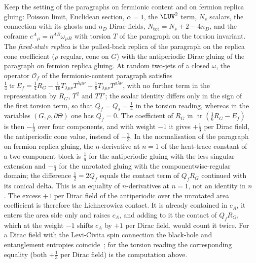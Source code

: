 Keep the setting of the paragraphs on fermionic content and on fermion replica gluing: Poisson limit, Euclidean section, \(\alpha=1\), the \(\LUV^2\) term, \(N_s\) scalars, the connection with its ghosts and \(n_D\) Dirac fields, \(N_{\mathrm{tot}}=N_s+2-4n_D\), and the coframe \(e^A{}_\mu=\eta^{AB}\omega_{\mu B}\) with torsion \(T\) of the paragraph on the torsion invariant. The \emph{fixed-state replica} is the pulled-back replica of the paragraph on the replica cone coefficient (\(\rho\) regular, cone on \(G\)) with the antiperiodic Dirac gluing of the paragraph on fermion replica gluing. At random two-jets of a closed \(\omega\), the operator \(\mathcal O_f\) of the fermionic-content paragraph satisfies \(\tfrac14\operatorname{tr}E_f=\tfrac14R_G-\tfrac1{16}T_{\lambda\mu\nu}T^{\lambda\mu\nu}+\tfrac18T_{\lambda\mu\nu}T^{\mu\lambda\nu}\), with no further term in the representation by \(R_G\), \(T^2\) and \(TT'\); the scalar identity differs only in the sign of the first torsion term, so that \(Q_f=Q_s=\tfrac14\) in the torsion reading, whereas in the variables \((G,\rho,\partial\Theta)\) one has \(Q_f=0\). The coefficient of \(R_G\) in \(\operatorname{tr}(\tfrac16R_G-E_f)\) is then \(-\tfrac13\) over four components, and with weight \(-1\) it gives \(+\tfrac13\) per Dirac field, the antiperiodic cone value, instead of \(-\tfrac23\). In the normalisation of the paragraph on fermion replica gluing, the \(n\)-derivative at \(n=1\) of the heat-trace constant of a two-component block is \(\tfrac16\) for the antiperiodic gluing with the less singular extension and \(-\tfrac13\) for the unrotated gluing with the componentwise-regular domain; the difference \(\tfrac12=2Q_f\) equals the contact term of \(Q_fR_G\) continued with its conical delta. This is an equality of \(n\)-derivatives at \(n=1\), not an identity in \(n\). The excess \(+1\) per Dirac field of the antiperiodic over the unrotated area coefficient is therefore the Lichnerowicz contact. It is already contained in \(c_A\), it enters the area side only and raises \(c_A\), and adding to it the contact of \(Q_fR_G\), which at the weight \(-1\) shifts \(c_A\) by \(+1\) per Dirac field, would count it twice. For a Dirac field with the Levi-Civita spin connection the black-hole and entanglement entropies coincide~\cite{Kabat1995}; for the torsion reading the corresponding equality (both \(+\tfrac13\) per Dirac field) is the computation above.



